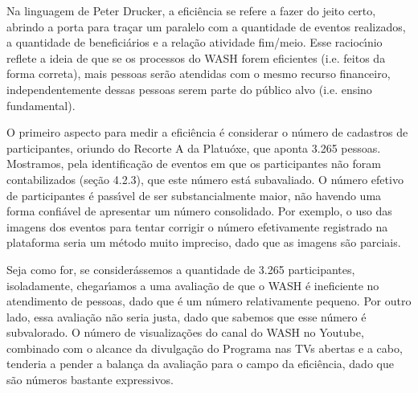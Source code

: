\documentclass[
12pt,		%
openright,	%
twoside,  %
a4paper,			%
chapter=TITLE,		%
english,			%
french,				%
spanish,			%
brazil				%
]{USPSC-classe/USPSC}
\begin{document}
Na linguagem de Peter Drucker, a efici\^encia se refere a \textquotedbl fazer do jeito certo\textquotedbl , abrindo a porta para tra\c{c}ar um paralelo com a quantidade de eventos realizados, a quantidade de benefici\'arios e a rela\c{c}\~ao atividade fim/meio. Esse racioc\'{\i}nio reflete a ideia de que se os processos do WASH forem eficientes (i.e. \textquotedbl feitos da forma correta\textquotedbl ), mais pessoas ser\~ao atendidas com o mesmo recurso financeiro, independentemente dessas pessoas serem parte do p\'ublico alvo (i.e. ensino fundamental).









O primeiro aspecto para medir a efici\^encia \'e considerar o n\'umero de cadastros de participantes, oriundo do Recorte A da Platu\'oxe, que aponta 3.265 pessoas. Mostramos, pela identifica\c{c}\~ao de eventos em que os participantes n\~ao foram contabilizados (se\c{c}\~ao 4.2.3), que este n\'umero est\'a subavaliado. O n\'umero efetivo de participantes \'e pass\'{\i}vel de ser substancialmente maior, n\~ao havendo uma forma confi\'avel de apresentar um n\'umero consolidado. Por exemplo, o uso das imagens dos eventos para tentar corrigir o n\'umero efetivamente registrado na plataforma seria um m\'etodo muito impreciso, dado que as imagens s\~ao parciais.









Seja como for, se consider\'assemos a quantidade de 3.265 participantes, isoladamente, chegar\'{\i}amos a uma avalia\c{c}\~ao de que o WASH \'e ineficiente no atendimento de pessoas, dado que \'e um n\'umero relativamente pequeno. Por outro lado, essa avalia\c{c}\~ao n\~ao seria justa, dado que sabemos que esse n\'umero \'e subvalorado. O n\'umero de visualiza\c{c}\~oes do canal do WASH no Youtube, combinado com o alcance da divulga\c{c}\~ao do Programa nas TVs abertas e a cabo, tenderia a pender a balan\c{c}a da avalia\c{c}\~ao para o campo da efici\^encia, dado que s\~ao n\'umeros bastante expressivos.
\end{document}
